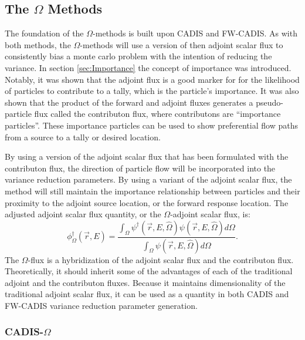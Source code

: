 \subsection{The $\Omega$ Methods}
\label{sec:omegaintro}

The foundation of the $\Omega$-methods is built upon CADIS and FW-CADIS. As with
both methods,
the $\Omega$-methods will use a version of then adjoint scalar flux to
consistently bias a monte carlo problem with the intention of reducing the
variance. In section \ref{sec:Importance} the concept of importance was
introduced. Notably, it was shown that the adjoint flux is a good marker for
for the likelihood of particles to contribute to a tally, which is the
particle's importance. It was also shown that the
product of the forward and adjoint fluxes generates a pseudo-particle flux called
the contributon flux, where contributons are ``importance particles''.
These importance particles can be used to show preferential flow paths from a
source to a tally or desired location.

By using a version of the adjoint scalar flux that has been formulated with the
contributon flux, the direction of particle flow will be incorporated into the
variance reduction parameters. By using a variant of the adjoint scalar flux,
the method will still maintain the importance relationship between particles and
their proximity to the adjoint source location, or the forward response
location. The adjusted adjoint scalar flux quantity, or the $\Omega$-adjoint
scalar flux, is:
%
\begin{equation}
  \phi^{\dagger}_{\Omega}(\vec {r} ,E)  = \frac{\int_{\Omega}{\psi^{\dagger}
                             (\vec{r}, E, \hat\Omega)
                             \psi(\vec{r}, E, \hat\Omega)} d\Omega}
                             {\int_{\Omega}\psi(\vec{r}, E, \hat\Omega)
                           d\Omega}.
\label{eq:omega_basic}
\end{equation}
%
The $\Omega$-flux is a hybridization of the adjoint scalar flux and the contributon
flux. Theoretically, it should inherit some of the advantages of
each of the traditional
adjoint and the contributon fluxes. Because it maintains dimensionality of the
traditional adjoint scalar flux, it can be used as a quantity in both
CADIS and FW-CADIS variance reduction parameter generation.

\subsubsection{CADIS-$\Omega$}
\label{sec:cadomega}

